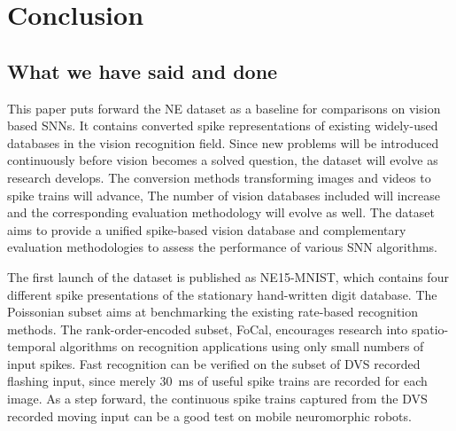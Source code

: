 \section{Conclusion}
\label{sec:summ}
\subsection{What we have said and done}
%
%

This paper puts forward the NE dataset as a baseline for comparisons on vision based SNNs.
It contains converted spike representations of existing widely-used databases in the vision recognition field.
Since new problems will be introduced continuously before vision becomes a solved question, the dataset will evolve as research develops. 
The conversion methods transforming images and videos to spike trains will advance, The number of vision databases included will increase and the corresponding evaluation methodology will evolve as well.
The dataset aims to provide a unified spike-based vision database and complementary evaluation methodologies to assess the performance of various SNN algorithms.

The first launch of the dataset is published as NE15-MNIST, which contains four different spike presentations of the stationary hand-written digit database.
The Poissonian subset aims at benchmarking the existing rate-based recognition methods.
The rank-order-encoded subset, FoCal, encourages research into spatio-temporal algorithms on recognition applications using only small numbers of input spikes.
Fast recognition can be verified on the subset of DVS recorded flashing input, since merely 30~ms of useful spike trains are recorded for each image.
As a step forward, the continuous spike trains captured from the DVS recorded moving input can be a good test on mobile neuromorphic robots.

